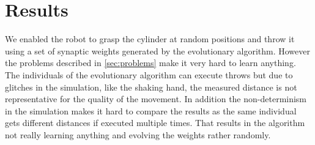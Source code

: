 \section{Results}
\label{sec:results}
We enabled the robot to grasp the cylinder at random positions and throw it using a set of synaptic weights generated by the evolutionary algorithm.
However the problems described in \autoref{sec:problems} make it very hard to learn anything.
The individuals of the evolutionary algorithm can execute throws but due to glitches in the simulation, like the shaking hand, the measured distance is not representative for the quality of the movement.
In addition the non-determinism in the simulation makes it hard to compare the results as the same individual gets different distances if executed multiple times.
That results in the algorithm not really learning anything and evolving the weights rather randomly.
